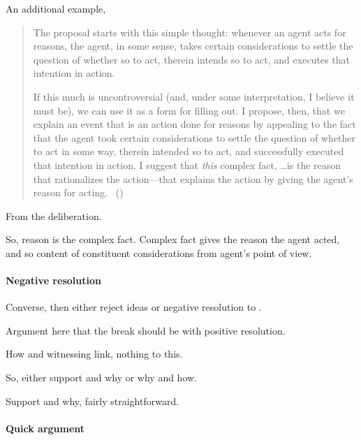\begin{note}
  An additional example, \citeauthor{Hieronymi:2011aa}
  \begin{quote}
    The proposal starts with this simple thought: whenever an agent acts for reasons, the agent, in some sense, takes certain considerations to settle the question of whether so to act, therein intends so to act, and executes that intention in action.

    If this much is uncontroversial (and, under some interpretation, I believe it must be), we can use it as a form for filling out.
    I propose, then, that we explain an event that is an action done for reasons by appealing to the fact that the agent took certain considerations to settle the question of whether to act in some way, therein intended so to act, and successfully executed that intention in action.
    I suggest that \emph{this} complex fact, \dots is the reason that rationalizes the action---that explains the action by giving the agent’s reason for acting.%
    \mbox{ }\hfill\mbox{(\citeyear[431]{Hieronymi:2011aa})}
  \end{quote}

  From the deliberation.

  So, reason is the complex fact.
  Complex fact gives the reason the agent acted, and so content of constituent considerations from agent's point of view.
\end{note}

\paragraph{Negative resolution}

\begin{note}
  Converse, then either reject ideas or negative resolution to \issueInclusion{}.
\end{note}

\begin{note}
  Argument here that the break should be with positive resolution.

  How and witnessing link, nothing to this.

  So, either support and why or why and how.

  Support and why, fairly straightforward.
\end{note}


\paragraph*{Quick argument}

